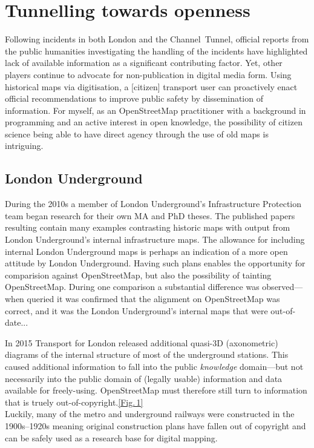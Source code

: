 \documentclass[conference,a4paper]{IEEEtran}
\begin{document}
\section{Tunnelling towards openness}

Following incidents in both London and the Channel~Tunnel, official
reports from the public humanities investigating the handling of the
incidents have highlighted lack of available information as a
significant contributing factor.\cite{riab-2010}\cite{riab-2013} Yet,
other players continue to advocate for non-publication in digital
media form.\cite{foi-2011} Using historical maps via digitisation, a
[citizen] transport user can proactively enact official
recommendations to improve public safety by dissemination of
information. For myself, as an OpenStreetMap
practitioner with a background in programming and an active interest
in open knowledge, the possibility of citizen science being able to
have direct agency through the use of old maps is intriguing.

\subsection{London Underground}\vspace{-0.2em}

During the 2010s a member of London Underground's Infrastructure
Protection team began research for their own MA and PhD theses.  The
published papers resulting contain many examples contrasting historic
maps with output from London Underground's internal infrastructure
maps.\cite{darroch-2012}\cite{darroch-2014} The allowance for
including internal London Underground maps is perhaps an indication of a
more open attitude by London Underground.  Having such plans enables the opportunity for
comparision against OpenStreetMap, but also the possibility of
tainting OpenStreetMap.  During one comparison a substantial difference was observed---when queried it was confirmed that the
alignment on OpenStreetMap was correct, and it was the 
London Underground's internal maps that were out-of-date...

In 2015 Transport for London released additional quasi-{\small 3D} (axonometric) diagrams of
the internal structure of most of the underground stations.\cite{foi-2015}
This caused additional information to fall into the public {\it knowledge}
domain---but not necessarily into the public domain of (legally usable) information and
data available for freely-using.  OpenStreetMap must therefore still
turn to information that is truely out-of-copyright.\hfill{}\hyperref[fig:south-ken-bends]{[Fig.\,1]}\\
Luckily, many of the metro and underground railways were constructed in the
1900s--1920s meaning original construction plans have
fallen out of copyright and can be safely used as a research base for digital mapping.
\end{document}
